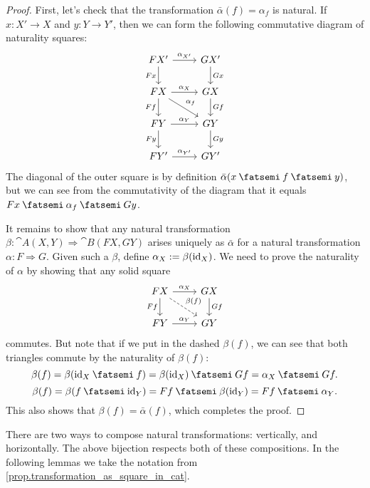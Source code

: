 \documentclass[DynamicalBook]{subfiles}
\begin{document}
\begin{proof}
First, let's check that the transformation $\bar{\alpha}(f) = \alpha_f$ is
natural. If $x : X' \to X$ and $y : Y \to Y'$, then we can form the following
commutative diagram of naturality squares:
\[
    \begin{tikzcd}
      FX' \ar[r, "\alpha_{X'}"] \ar[d, "Fx"'] & GX' \ar[d, "Gx"] \\
      FX \ar[r, "\alpha_X"] \ar[d, "Ff"'] \ar[dr, "\alpha_f"]& GX \ar[d, "Gf"] \\
      FY \ar[r, "\alpha_{Y}"] \ar[d, "Fy"'] & GY \ar[d, "Gy"] \\
      FY' \ar[r, "\alpha_{Y'}"] & GY'
    \end{tikzcd}
\]
The diagonal of the outer square is by definition $\bar{\alpha}(x\then f\then y)$, but we
can see from the commutativity of the diagram that it equals $Fx \then \alpha_f
\then Gy$.

It remains to show that any natural transformation $\beta : \cat{A}(X, Y)
\Rightarrow \cat{B}(FX, GY)$ arises uniquely as $\bar{\alpha}$ for a natural
transformation $\alpha : F \Rightarrow G$. Given such a $\beta$, define $\alpha_X
:= \beta(\mathrm{id}_{X})$. We need to prove the naturality of $\alpha$ by showing that
any solid square
\[
    \begin{tikzcd}
      FX \ar[r, "\alpha_X"] \ar[d, "Ff"'] \ar[dr, dashed, "\beta(f)"] & GX \ar[d, "Gf"] \\
      FY \ar[r, "\alpha_Y"] & GY
    \end{tikzcd}
\]
commutes. But note that if we put in the dashed $\beta(f)$, we can see that both
triangles commute by the naturality of $\beta(f)$:
$$\beta(f) = \beta(\id_X \then f) = \beta(\id_X) \then Gf = \alpha_X \then Gf.$$
$$\beta(f) = \beta(f \then \id_Y) = Ff \then \beta(\id_Y) = Ff \then \alpha_Y.$$
This also shows that $\beta(f) = \bar{\alpha}(f)$, which completes the proof.
\end{proof}

There are two ways to compose natural transformations: vertically, and
horizontally. The above bijection respects both of these compositions. In the
following lemmas we take the notation from \cref{prop.transformation_as_square_in_cat}.
\end{document}
